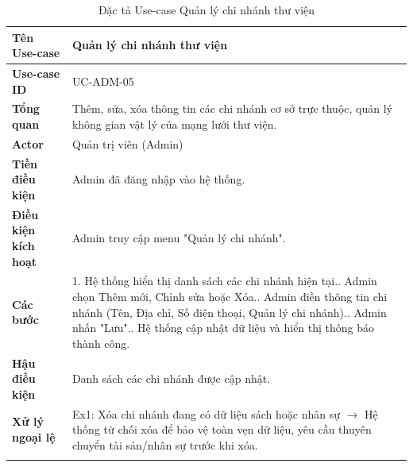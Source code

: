\begin{longtable}{|p{3.5cm}|p{11.5cm}|}
    \hline
    \textbf{Tên Use-case} & \textbf{Quản lý chi nhánh thư viện} \\
    \hline
    \textbf{Use-case ID} & UC-ADM-05 \\
    \hline
    \textbf{Tổng quan} & Thêm, sửa, xóa thông tin các chi nhánh cơ sở trực thuộc, quản lý không gian vật lý của mạng lưới thư viện. \\
    \hline
    \textbf{Actor} & Quản trị viên (Admin) \\
    \hline
    \textbf{Tiền điều kiện} & Admin đã đăng nhập vào hệ thống. \\
    \hline
    \textbf{Điều kiện kích hoạt} & Admin truy cập menu "Quản lý chi nhánh". \\
    \hline
    \textbf{Các bước} & 
    1. Hệ thống hiển thị danh sách các chi nhánh hiện tại.\newline
    2. Admin chọn Thêm mới, Chỉnh sửa hoặc Xóa.\newline
    3. Admin điền thông tin chi nhánh (Tên, Địa chỉ, Số điện thoại, Quản lý chi nhánh).\newline
    4. Admin nhấn "Lưu".\newline
    5. Hệ thống cập nhật dữ liệu và hiển thị thông báo thành công. \\
    \hline
    \textbf{Hậu điều kiện} & Danh sách các chi nhánh được cập nhật. \\
    \hline
    \textbf{Xử lý ngoại lệ} & 
    Ex1: Xóa chi nhánh đang có dữ liệu sách hoặc nhân sự $\rightarrow$ Hệ thống từ chối xóa để bảo vệ toàn vẹn dữ liệu, yêu cầu thuyên chuyển tài sản/nhân sự trước khi xóa. \\
    \hline
    \caption{Đặc tả Use-case Quản lý chi nhánh thư viện}
\end{longtable}

